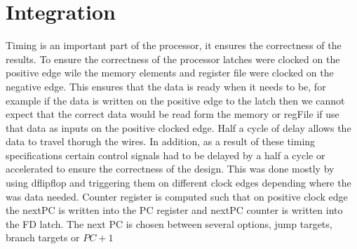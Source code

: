 \section*{Integration}
Timing is an important part of the processor, it ensures the correctness of the results. To ensure the correctness of the processor latches were clocked on the positive edge wile the memory elements and register file were clocked on the negative edge. This ensures that the data is ready when it needs to be, for example if the data is written on the positive edge to the latch then we cannot expect that the correct data would be read form the memory or regFile if use that data as inputs on the positive clocked edge. Half a cycle of delay allows the data to travel thorugh the wires. In addition, as a result of these timing specifications certain control signals had to be delayed by a half a cycle or accelerated to ensure the correctness of  the design. This was done mostly by using dflipflop and triggering them on different clock edges depending where the was data needed. Counter register is computed such that on positive clock edge the nextPC is written into the PC register and nextPC counter is written into the FD latch. The next PC is chosen between several options, jump targets, branch targets or $PC+1$ 



